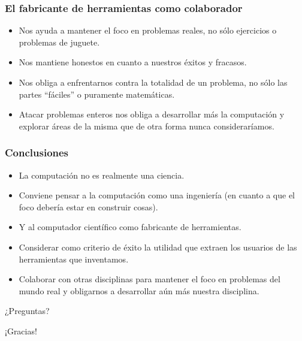 \documentclass[spanish]{beamer}
\begin{document}
\begin{frame}
  \frametitle{El fabricante de herramientas como colaborador}

  \pause

  \begin{itemize}
    \item Nos ayuda a mantener el foco en problemas reales, no sólo ejercicios
      o problemas de juguete.

    \pause

    \item Nos mantiene honestos en cuanto a nuestros éxitos y fracasos.

    \pause

    \item Nos obliga a enfrentarnos contra la totalidad de un problema, no sólo
      las partes ``fáciles'' o puramente matemáticas.

    \pause

    \item Atacar problemas enteros nos obliga a desarrollar más la computación
      y explorar áreas de la misma que de otra forma nunca consideraríamos.
  \end{itemize}
\end{frame}

\begin{frame}
  \frametitle{Conclusiones}

  \pause

  \begin{itemize}
    \item La computación no es realmente una ciencia.

    \pause

    \item Conviene pensar a la computación como una ingeniería (en cuanto a que
      el foco debería estar en construir cosas).

    \pause

    \item Y al computador científico como fabricante de herramientas.

    \pause

    \item Considerar como criterio de éxito la utilidad que extraen los
      usuarios de las herramientas que inventamos.

    \pause

    \item Colaborar con otras disciplinas para mantener el foco en problemas
      del mundo real y obligarnos a desarrollar aún más nuestra disciplina.
  \end{itemize}
\end{frame}

\begin{frame}
  \begin{center}
    \Huge{¿Preguntas?}
  \end{center}
\end{frame}

\begin{frame}
  \begin{center}
    \Huge{¡Gracias!}
  \end{center}
\end{frame}
\end{document}
